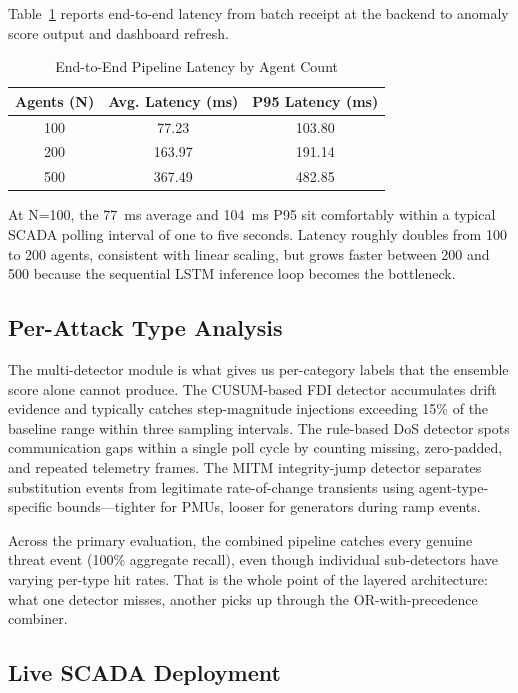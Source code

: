 \documentclass[conference]{IEEEtran}
\begin{document}
Table~\ref{tab:latency} reports end-to-end latency from batch receipt at the backend to anomaly score output and dashboard refresh.

\begin{table}[htbp]
\caption{End-to-End Pipeline Latency by Agent Count}
\begin{center}
\begin{tabular}{|c|c|c|}
\hline
\textbf{Agents (N)} & \textbf{Avg. Latency (ms)} & \textbf{P95 Latency (ms)} \\
\hline
100 & 77.23 & 103.80 \\
\hline
200 & 163.97 & 191.14 \\
\hline
500 & 367.49 & 482.85 \\
\hline
\end{tabular}
\label{tab:latency}
\end{center}
\end{table}

At N=100, the 77~ms average and 104~ms P95 sit comfortably within a typical SCADA polling interval of one to five seconds. Latency roughly doubles from 100 to 200 agents, consistent with linear scaling, but grows faster between 200 and 500 because the sequential LSTM inference loop becomes the bottleneck.

\subsection{Per-Attack Type Analysis}

The multi-detector module is what gives us per-category labels that the ensemble score alone cannot produce. The CUSUM-based FDI detector accumulates drift evidence and typically catches step-magnitude injections exceeding 15\% of the baseline range within three sampling intervals. The rule-based DoS detector spots communication gaps within a single poll cycle by counting missing, zero-padded, and repeated telemetry frames. The MITM integrity-jump detector separates substitution events from legitimate rate-of-change transients using agent-type-specific bounds---tighter for PMUs, looser for generators during ramp events.

Across the primary evaluation, the combined pipeline catches every genuine threat event (100\% aggregate recall), even though individual sub-detectors have varying per-type hit rates. That is the whole point of the layered architecture: what one detector misses, another picks up through the OR-with-precedence combiner.

\subsection{Live SCADA Deployment}
\end{document}
